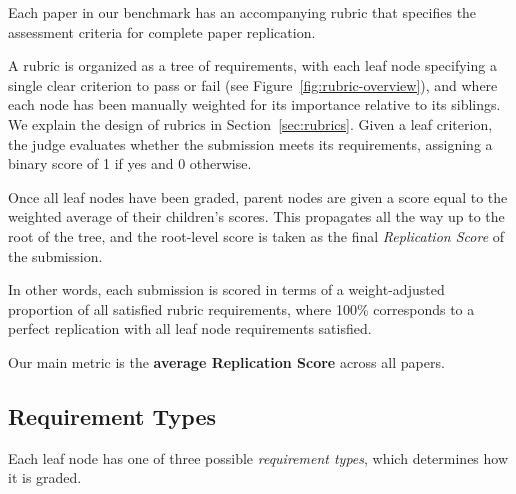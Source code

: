 \documentclass{article}
\theoremstyle{plain}
\theoremstyle{definition}
\theoremstyle{remark}
\begin{document}
Each paper in our benchmark has an accompanying rubric that specifies the assessment criteria for complete paper replication. 

A rubric is organized as a tree of requirements, with each leaf node specifying a single clear criterion to pass or fail (see Figure~\ref{fig:rubric-overview}), and where each node has been manually weighted for its importance relative to its siblings. We explain the design of rubrics in Section~\ref{sec:rubrics}. Given a leaf criterion, the judge evaluates whether the submission meets its requirements, assigning a binary score of 1 if yes and 0 otherwise.

Once all leaf nodes have been graded, parent nodes are given a score equal to the weighted average of their children’s scores. This propagates all the way up to the root of the tree, and the root-level score is taken as the final \textit{Replication Score} of the submission.

In other words, each submission is scored in terms of a weight-adjusted proportion of all satisfied rubric requirements, where 100\% corresponds to a perfect replication with all leaf node requirements satisfied.

Our main metric is the \textbf{average Replication Score} across all papers.

\subsection{Requirement Types}

Each leaf node has one of three possible \textit{requirement types}, which determines how it is graded.
\end{document}
